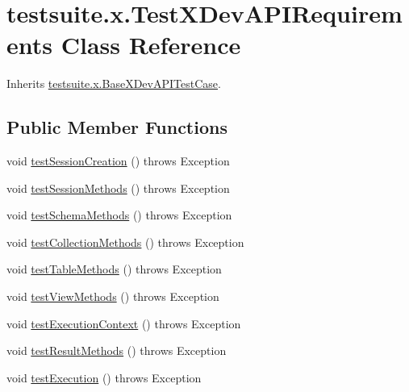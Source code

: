 \hypertarget{classtestsuite_1_1x_1_1_test_x_dev_a_p_i_requirements}{}\section{testsuite.\+x.\+Test\+X\+Dev\+A\+P\+I\+Requirements Class Reference}
\label{classtestsuite_1_1x_1_1_test_x_dev_a_p_i_requirements}


Inherits \mbox{\hyperlink{classtestsuite_1_1x_1_1_base_x_dev_a_p_i_test_case}{testsuite.\+x.\+Base\+X\+Dev\+A\+P\+I\+Test\+Case}}.

\subsection*{Public Member Functions}
\begin{DoxyCompactItemize}
\item 
void \mbox{\hyperlink{classtestsuite_1_1x_1_1_test_x_dev_a_p_i_requirements_aa9f988a47feadf60dff0dd5c2007666e}{test\+Session\+Creation}} ()  throws Exception 
\item 
void \mbox{\hyperlink{classtestsuite_1_1x_1_1_test_x_dev_a_p_i_requirements_aabef741053d566136136b5cfb3c8bb49}{test\+Session\+Methods}} ()  throws Exception 
\item 
void \mbox{\hyperlink{classtestsuite_1_1x_1_1_test_x_dev_a_p_i_requirements_ab061abe9969e81b420f800db4d744ded}{test\+Schema\+Methods}} ()  throws Exception 
\item 
void \mbox{\hyperlink{classtestsuite_1_1x_1_1_test_x_dev_a_p_i_requirements_aa06285f6ab2ccc7793e5f7e09528e3e6}{test\+Collection\+Methods}} ()  throws Exception 
\item 
void \mbox{\hyperlink{classtestsuite_1_1x_1_1_test_x_dev_a_p_i_requirements_ae823521ae39df7db803e0d2d865d1231}{test\+Table\+Methods}} ()  throws Exception 
\item 
void \mbox{\hyperlink{classtestsuite_1_1x_1_1_test_x_dev_a_p_i_requirements_abe35866f814afea6ea1f17133b93d9de}{test\+View\+Methods}} ()  throws Exception 
\item 
void \mbox{\hyperlink{classtestsuite_1_1x_1_1_test_x_dev_a_p_i_requirements_ae10665b90ab08a01514462b80139c145}{test\+Execution\+Context}} ()  throws Exception 
\item 
void \mbox{\hyperlink{classtestsuite_1_1x_1_1_test_x_dev_a_p_i_requirements_a3e75c9a73d04ce7ef9092afcb2a43947}{test\+Result\+Methods}} ()  throws Exception 
\item 
void \mbox{\hyperlink{classtestsuite_1_1x_1_1_test_x_dev_a_p_i_requirements_ad96e5238ad5e533b75e90bb4e40b50ac}{test\+Execution}} ()  throws Exception 
\end{DoxyCompactItemize}

